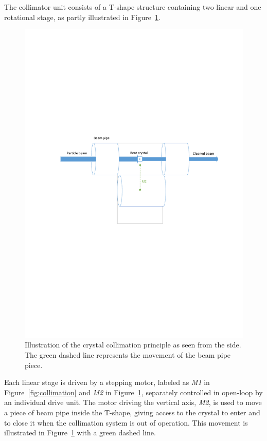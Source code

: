 The collimator unit consists of a T-shape structure containing two linear and one rotational stage, as partly illustrated in Figure~\ref{fig:goniometer}.

\begin{figure}[h]
  \centering %
  \includegraphics[width=1\textwidth, trim= 2cm 12cm 1cm 10cm, clip=true]{fig/matlab/goniometer}
  \caption{\label{fig:goniometer}Illustration of the crystal collimation principle as seen from the side. The green dashed line represents the movement of the beam pipe piece.}
\end{figure}

Each linear stage is driven by a stepping motor, labeled as \emph{M1} in Figure~\ref{fig:collimation} and \emph{M2} in Figure~\ref{fig:goniometer}, separately controlled in open-loop by an individual drive unit. The motor driving the vertical axis, \emph{M2}, is used to move a piece of beam pipe inside the T-shape, giving access to the crystal to enter and to close it when the collimation system is out of operation. This movement is illustrated in Figure~\ref{fig:goniometer} with a green dashed line.

